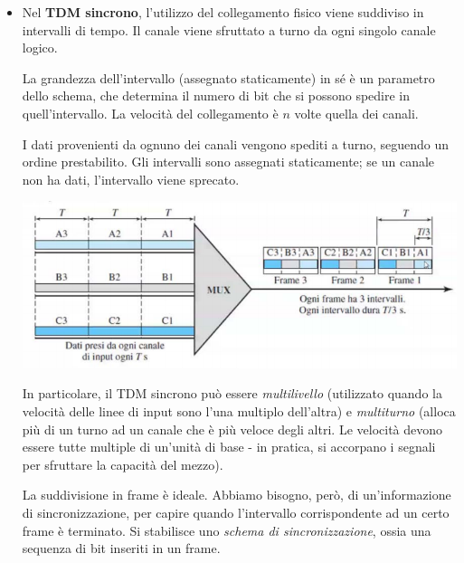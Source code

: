 \begin{itemize}
                \begin{itemize}
                    \item 
                        Nel \textbf{TDM sincrono}, l'utilizzo del collegamento fisico viene suddiviso in intervalli di tempo. Il canale viene sfruttato a turno da ogni singolo canale logico. 
                        
                        La grandezza dell'intervallo (assegnato staticamente) in sé è un parametro dello schema, che determina il numero di bit che si possono spedire in quell'intervallo. La velocità del collegamento è $n$ volte quella dei canali. 
                        
                        I dati provenienti da ognuno dei canali vengono spediti a turno, seguendo un ordine prestabilito. Gli intervalli sono assegnati staticamente; se un canale non ha dati, l'intervallo viene sprecato.
                    
                        \begin{center}
                            \includegraphics[scale=0.6]{images/TDM_Sincrono.png}
                        \end{center}
                    
                        In particolare, il TDM sincrono può essere \textit{multilivello} (utilizzato quando la velocità delle linee di input sono l'una multiplo dell'altra) e \textit{multiturno} (alloca più di un turno ad un canale che è più veloce degli altri. Le velocità devono essere tutte multiple di un'unità di base - in pratica, si accorpano i segnali per sfruttare la capacità del mezzo).
                        
                        \vspace{3mm}
                        
                        La suddivisione in frame è ideale. Abbiamo bisogno, però, di un'informazione di sincronizzazione, per capire quando l'intervallo corrispondente ad un certo frame è terminato. Si stabilisce uno \textit{schema di sincronizzazione}, ossia una sequenza di bit inseriti in un frame. 
                        

\end{itemize}
\end{itemize}
